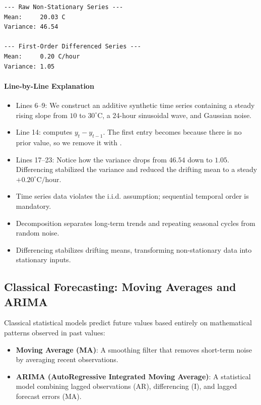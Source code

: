 \begin{lstlisting}[style=outputstyle]
--- Raw Non-Stationary Series ---
Mean:     20.03 C
Variance: 46.54

--- First-Order Differenced Series ---
Mean:     0.20 C/hour
Variance: 1.05
\end{lstlisting}

\paragraph{Line-by-Line Explanation}
\begin{itemize}
    \item Lines 6--9: We construct an additive synthetic time series containing a steady rising slope from $10$ to $30^\circ\text{C}$, a 24-hour sinusoidal wave, and Gaussian noise.
    \item Line 14:  computes $y_t - y_{t-1}$. The first entry becomes  because there is no prior value, so we remove it with .
    \item Lines 17--23: Notice how the variance drops from $46.54$ down to $1.05$. Differencing stabilized the variance and reduced the drifting mean to a steady $+0.20^\circ\text{C/hour}$.
\end{itemize}

\begin{takeaways}
\begin{itemize}
    \item Time series data violates the i.i.d. assumption; sequential temporal order is mandatory.
    \item Decomposition separates long-term trends and repeating seasonal cycles from random noise.
    \item Differencing stabilizes drifting means, transforming non-stationary data into stationary inputs.
\end{itemize}
\end{takeaways}

\subsection{Classical Forecasting: Moving Averages and ARIMA}

\begin{keyidea}
Classical statistical models predict future values based entirely on mathematical patterns observed in past values:
\begin{itemize}
    \item \textbf{Moving Average (MA)}: A smoothing filter that removes short-term noise by averaging recent observations.
    \item \textbf{ARIMA (AutoRegressive Integrated Moving Average)}: A statistical model combining lagged observations (AR), differencing (I), and lagged forecast errors (MA).
\end{itemize}
\end{keyidea}

